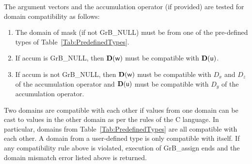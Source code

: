 The argument vectors and the accumulation 
operator (if provided) are tested for domain compatibility as follows:
\begin{enumerate}
	\item The domain of {\sf mask} (if not {\sf GrB\_NULL}) must be from one of 
    the pre-defined types of Table~\ref{Tab:PredefinedTypes}.

	\item If {\sf accum} is {\sf GrB\_NULL}, then $\bold{D}({\sf w})$ must be 
    compatible with $\bold{D}({\sf u})$.

	\item If {\sf accum} is not {\sf GrB\_NULL}, then $\bold{D}({\sf w})$ must be
    compatible with $D_x$ and $D_z$ of the accumulation operator and 
    $\bold{D}({\sf u})$ must be compatible with $D_y$ of the accumulation operator.
\end{enumerate}
Two domains are compatible with each other if values from one domain can be cast 
to values in the other domain as per the rules of the C language.
In particular, domains from Table~\ref{Tab:PredefinedTypes} are all compatible 
with each other. A domain from a user-defined type is only compatible with itself.
If any compatibility rule above is violated, execution of {\sf GrB\_assign} ends
and the domain mismatch error listed above is returned.

